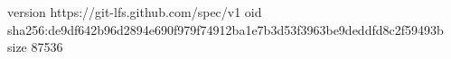 version https://git-lfs.github.com/spec/v1
oid sha256:de9df642b96d2894e690f979f74912ba1e7b3d53f3963be9deddfd8c2f59493b
size 87536
